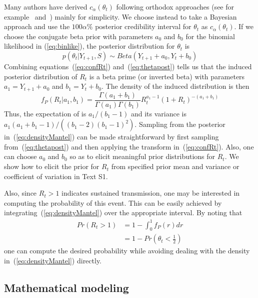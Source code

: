 Many authors have derived $c_{\alpha}(\theta_t)$ following orthodox approaches  
(see for example~\cite{wilson} and~\cite{clopper}) mainly for simplicity.
We choose instead to take a Bayesian approach and use the  $100\alpha \%$ 
posterior credibility interval for $\theta_t$ as $c_{\alpha}(\theta_t)$.
If we choose the conjugate beta prior with parameters $a_0$ and $b_0$ for the 
binomial likelihood in (\ref{eq:binlike}), the posterior distribution for 
$\theta_t$ is
\begin{equation}
\label{eq:thetapost}
p(\theta_t| Y_{t+1}, S) \sim Beta(Y_{t+1} + a_0, Y_t + b_0)
\end{equation}
Combining equations~(\ref{eq:confRt}) and~(\ref{eq:thetapost}) 
tells us that the induced posterior distribution of $R_t$ is 
a beta prime (or inverted beta) with parameters $ a_1 = Y_{t+1} + a_0$ and $b_1 
=  Y_t + b_0$.
The density of the induced distribution is then 
\begin{equation}
\label{eq:densityMantel}
f_P(R_t| a_1, b_1) = \frac{\Gamma(a_1 + b_1)}{\Gamma(a_1)\Gamma(b_1)} R_t^{a_1 - 
1} (1 + R_t)^{-(a_1 + b_1)}
\end{equation}
Thus, the expectation of \rr is $a_1/(b_1 - 1)$ and its variance is 
$a_1(a_1 + b_1 - 1)/\left((b_1 - 2)(b_1 - 1)^2 \right) $.
Sampling from the posterior in~(\ref{eq:densityMantel}) can be made 
straightforward by first sampling from~(\ref{eq:thetapost}) and then applying 
the transform in~(\ref{eq:confRt}).
Also, one can choose $a_0$ and $b_0$ so as to elicit meaningful prior distributions
for $R_t$.
We show how to elicit the prior for $R_t$ from specified prior mean and variance
or coefficient of variation in Text S1.

Also, since $R_t > 1$ indicates sustained transmission, one may be 
interested in computing the probability of this event.
This can be easily achieved by integrating~(\ref{eq:densityMantel}) over the 
appropriate interval.
By noting that
\begin{align}
\label{cumprobMantel}
Pr(R_t > 1) &= 1 - \int_0^1 f_P(r)dr \\
            &= 1- Pr(\theta_t < \frac{1}{2})
\end{align}
one can compute the desired probability while avoiding dealing with the density 
in~(\ref{eq:densityMantel}) directly.

\subsection*{Mathematical modeling} %

